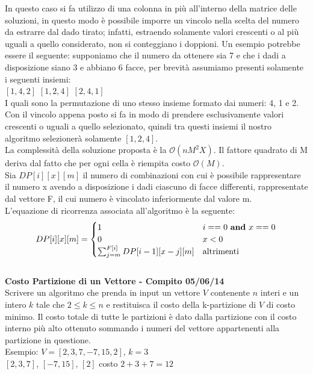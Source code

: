 \documentclass[../cheatSheetAlgoritmi.tex]{subfiles}
\begin{document}
In questo caso si fa utilizzo di una colonna in più all'interno della matrice delle soluzioni, in questo modo è possibile imporre un vincolo nella scelta del numero da estrarre dal dado tirato; infatti, estraendo solamente valori crescenti o al più uguali a quello considerato, non si conteggiano i doppioni. Un esempio potrebbe essere il seguente: supponiamo che il numero da ottenere sia 7 e che i dadi a disposizione siano 3 e abbiano 6 facce, per brevità assumiamo presenti solamente i seguenti insiemi: \\
$[1, 4, 2]$ $[1, 2, 4]$  $[2, 4, 1]$ \\
I quali sono la permutazione di uno stesso insieme formato dai numeri: 4, 1 e 2. Con il vincolo appena posto si fa in modo di prendere esclusivamente valori crescenti o uguali a quello selezionato, quindi tra questi insiemi il nostro algoritmo selezionerà solamente $[1, 2, 4]$. \\
La complessità della soluzione proposta è la $\mathcal{O}(nM^2X)$. Il fattore quadrato di M deriva dal fatto che per ogni cella è riempita costo $\mathcal{O}(M)$. \\
Sia $DP[i][x][m]$ il numero di combinazioni con cui è possibile rappresentare il numero x avendo a disposizione i dadi ciascuno di facce differenti, rappresentate dal vettore F, il cui numero è vincolato inferiormente dal valore m. \\
L'equazione di ricorrenza associata all'algoritmo è la seguente: 
\begin{equation*}
    DP[i][x][m]=\begin{cases}
        1 & \text{$i == 0$ \textbf{and} $x == 0$}\\
        0 & \text{$x < 0$} \\
        \sum_{j = m}^{F[i]} DP[i-1][x - j][m] & \text{altrimenti}
    \end{cases}
\end{equation*} \\
\textbf{Costo Partizione di un Vettore - Compito 05/06/14}\\
Scrivere un algoritmo che prenda in input un vettore $V$ contenente $n$ interi e un intero $k$ tale che $2 \leq k \leq n$ e restituisca il costo della k-partizione di $V$ di costo minimo. Il costo totale di tutte le partizioni è dato dalla partizione con il costo interno più alto ottenuto sommando i numeri del vettore appartenenti alla partizione in questione.\\
Esempio: $V = [2,3,7,-7,15,2]$, $k = 3$\\
$[2,3,7]$, $[-7,15]$, $[2]$ costo $2 + 3 + 7 = 12$\\
\end{document}
